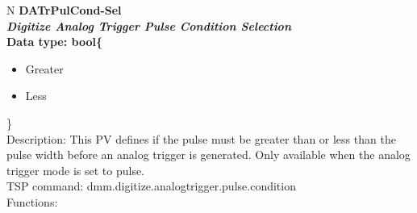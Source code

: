 \documentclass[openany]{article}
\begin{document}
		\begin{tabular}{N}
			\hline
			\bfseries DATrPulCond-Sel\label{pv:datrpulcond-sel} \\ \hline
			\emph{Digitize Analog Trigger Pulse Condition Selection} \\
			Data type: bool\{\begin{itemize}[noitemsep]
				\small
				\item[] Greater
				\item[] Less
			\end{itemize}\} \\
			Description: This PV defines if the pulse must be greater than or less than the pulse width before an analog trigger is generated. Only available when the analog trigger mode is set to pulse. \\
			TSP command: dmm.digitize.analogtrigger.pulse.condition \\
			Functions: \\
			\arrayrulecolor{\FuncTableBorderColor}

		\end{tabular}
\end{document}
